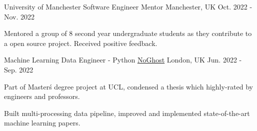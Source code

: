 



\begin{cventries}

    \cventry
        {University of Manchester} %
        {Software Engineer Mentor} %
        {Manchester, UK} %
        {Oct. 2022 - Nov. 2022} %
        {
        \begin{cvitems} %
            \item {Mentored a group of 8 second year undergraduate students as they contribute to a open source project. Received positive feedback.}
        \end{cvitems}
        }

    \cventry
        {Machine Learning Data Engineer - Python} %
        {\href{https://www.noghost.co.uk/}{NoGhost}} %
        {London, UK} %
        {Jun. 2022 - Sep. 2022} %
        {
        \begin{cvitems} %
            \item {Part of Master\'s degree project at UCL, condensed a thesis which highly-rated by engineers and professors.}
            \item {Built multi-processing data pipeline, improved and implemented state-of-the-art machine learning papers.}
        \end{cvitems}
        }


\end{cventries}